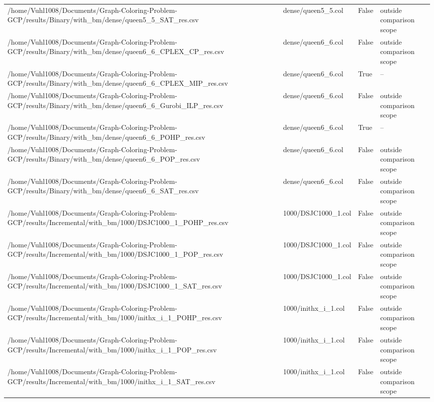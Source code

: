 \begin{table}[htbp]
\begin{tabular}{llll}
/home/Vuhl1008/Documents/Graph-Coloring-Problem-GCP/results/Binary/with\_bm/dense/queen5\_5\_SAT\_res.csv & dense/queen5\_5.col & False & outside comparison scope \\
/home/Vuhl1008/Documents/Graph-Coloring-Problem-GCP/results/Binary/with\_bm/dense/queen6\_6\_CPLEX\_CP\_res.csv & dense/queen6\_6.col & False & outside comparison scope \\
/home/Vuhl1008/Documents/Graph-Coloring-Problem-GCP/results/Binary/with\_bm/dense/queen6\_6\_CPLEX\_MIP\_res.csv & dense/queen6\_6.col & True & -- \\
/home/Vuhl1008/Documents/Graph-Coloring-Problem-GCP/results/Binary/with\_bm/dense/queen6\_6\_Gurobi\_ILP\_res.csv & dense/queen6\_6.col & False & outside comparison scope \\
/home/Vuhl1008/Documents/Graph-Coloring-Problem-GCP/results/Binary/with\_bm/dense/queen6\_6\_POHP\_res.csv & dense/queen6\_6.col & True & -- \\
/home/Vuhl1008/Documents/Graph-Coloring-Problem-GCP/results/Binary/with\_bm/dense/queen6\_6\_POP\_res.csv & dense/queen6\_6.col & False & outside comparison scope \\
/home/Vuhl1008/Documents/Graph-Coloring-Problem-GCP/results/Binary/with\_bm/dense/queen6\_6\_SAT\_res.csv & dense/queen6\_6.col & False & outside comparison scope \\
/home/Vuhl1008/Documents/Graph-Coloring-Problem-GCP/results/Incremental/with\_bm/1000/DSJC1000\_1\_POHP\_res.csv & 1000/DSJC1000\_1.col & False & outside comparison scope \\
/home/Vuhl1008/Documents/Graph-Coloring-Problem-GCP/results/Incremental/with\_bm/1000/DSJC1000\_1\_POP\_res.csv & 1000/DSJC1000\_1.col & False & outside comparison scope \\
/home/Vuhl1008/Documents/Graph-Coloring-Problem-GCP/results/Incremental/with\_bm/1000/DSJC1000\_1\_SAT\_res.csv & 1000/DSJC1000\_1.col & False & outside comparison scope \\
/home/Vuhl1008/Documents/Graph-Coloring-Problem-GCP/results/Incremental/with\_bm/1000/inithx\_i\_1\_POHP\_res.csv & 1000/inithx\_i\_1.col & False & outside comparison scope \\
/home/Vuhl1008/Documents/Graph-Coloring-Problem-GCP/results/Incremental/with\_bm/1000/inithx\_i\_1\_POP\_res.csv & 1000/inithx\_i\_1.col & False & outside comparison scope \\
/home/Vuhl1008/Documents/Graph-Coloring-Problem-GCP/results/Incremental/with\_bm/1000/inithx\_i\_1\_SAT\_res.csv & 1000/inithx\_i\_1.col & False & outside comparison scope \\

\end{tabular}
\end{table}
